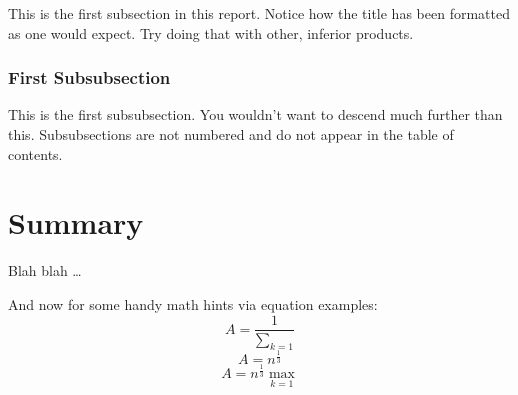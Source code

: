 This is the first subsection in this report. Notice how the title has been
formatted as one would expect. Try doing that with other, inferior products.

\subsubsection{First Subsubsection}

This is the first subsubsection. You wouldn't want to descend much further
than this. Subsubsections are not numbered and do not appear in the table of
contents.

\section{Summary}

Blah blah \ldots

And now for some handy math hints via equation examples:
\begin{equation}
A=\frac{1}{\displaystyle\sum_{k=1}^{}}
\end{equation}
\begin{equation}
A=n^{\frac{1}{3}}
\end{equation}
\begin{equation}
A=n^{\frac{1}{3}}\max_{k=1}
\end{equation}
